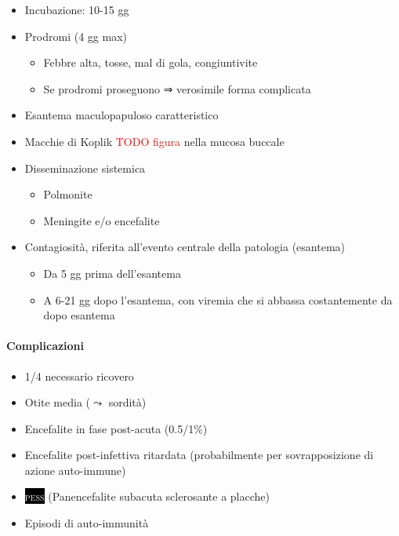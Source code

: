 \documentclass[italian,]{article}
\providecommand{\tightlist}{%
  \setlength{\itemsep}{0pt}\setlength{\parskip}{0pt}}
\newcommand{\asidefigure}[2]{\marginpar{\phantom{Img:}\newline\texttt{[image: \#1]}\\\footnotesize\emph{#2}}}
\newcommand{\pat}[1]{\colorbox{black}{\textcolor{white}{\textsc{#1}}}}
\newcommand{\TODO}[1]{\textcolor{red}{\textsf{\footnotesize{TODO #1}}}} %
\begin{document}
\begin{itemize}
\tightlist
\item
  Incubazione: 10-15 gg
\item
  Prodromi (4 gg max)

  \begin{itemize}
  \tightlist
  \item
    Febbre alta, tosse, mal di gola, congiuntivite
  \item
    Se prodromi proseguono ⇒ verosimile forma complicata
  \end{itemize}
\item
  Esantema maculopapuloso caratteristico
  \asidefigure{img/esantema-morbillo.png}{}
\item
  Macchie di Koplik \TODO{figura} nella mucosa buccale
\item
  Disseminazione sistemica

  \begin{itemize}
  \tightlist
  \item
    Polmonite
  \item
    Meningite e/o encefalite
  \end{itemize}
\item
  Contagiosità, riferita all'evento centrale della patologia (esantema)

  \begin{itemize}
  \tightlist
  \item
    Da 5 gg prima dell'esantema
  \item
    A 6-21 gg dopo l'esantema, con viremia che si abbassa costantemente
    da dopo esantema
  \end{itemize}
\end{itemize}

\hypertarget{complicazioni-1}{%
\paragraph{Complicazioni}\label{complicazioni-1}}

\begin{itemize}
\tightlist
\item
  1/4 necessario ricovero
\item
  Otite media (\(\leadsto\) sordità)
\item
  Encefalite in fase post-acuta (0.5/1\%)
\item
  Encefalite post-infettiva ritardata (probabilmente per sovrapposizione
  di azione auto-immune)
\item
  \pat{pess} (Panencefalite subacuta sclerosante a placche)
\item
  Episodi di auto-immunità
\end{itemize}
\end{document}
